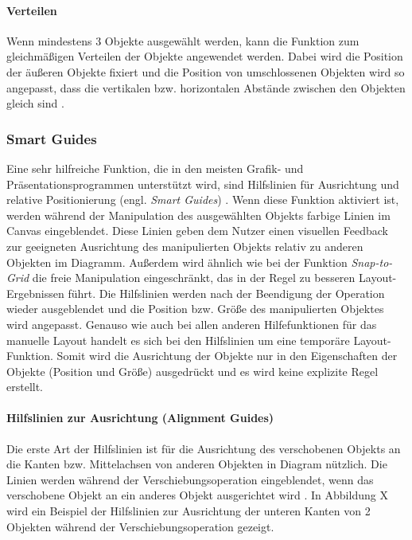 \paragraph{Verteilen}

Wenn mindestens 3 Objekte ausgewählt werden, kann die Funktion zum gleichmäßigen Verteilen der Objekte angewendet werden. Dabei wird die Position der äußeren Objekte fixiert und die Position von umschlossenen Objekten wird so angepasst, dass die vertikalen bzw. horizontalen Abstände zwischen den Objekten gleich sind \cite{11Keynote}.


\subsubsection{Smart Guides}
\label{subsubsec:smart-guides}

Eine sehr hilfreiche Funktion, die in den meisten Grafik- und Präsentationsprogrammen unterstützt wird, sind Hilfslinien für Ausrichtung und relative Positionierung (engl. \textit{Smart Guides}) \cite{11Keynote}. Wenn diese Funktion aktiviert ist, werden während der Manipulation des ausgewählten Objekts farbige Linien im Canvas eingeblendet. Diese Linien geben dem Nutzer einen visuellen Feedback zur geeigneten Ausrichtung des manipulierten Objekts relativ zu anderen Objekten im Diagramm. Außerdem wird ähnlich wie bei der Funktion \textit{Snap-to-Grid} die freie Manipulation eingeschränkt, das in der Regel zu besseren Layout-Ergebnissen führt. Die Hilfslinien werden nach der Beendigung der Operation wieder ausgeblendet und die Position bzw. Größe des manipulierten Objektes wird angepasst. Genauso wie auch bei allen anderen Hilfefunktionen für das manuelle Layout handelt es sich bei den Hilfslinien um eine temporäre Layout-Funktion. Somit wird die Ausrichtung der Objekte nur in den Eigenschaften der Objekte (Position und Größe) ausgedrückt und es wird keine explizite Regel erstellt.

\paragraph{Hilfslinien zur Ausrichtung (Alignment Guides)}

Die erste Art der Hilfslinien ist für die Ausrichtung des verschobenen Objekts an die Kanten bzw. Mittelachsen von anderen Objekten in Diagram nützlich. Die Linien werden während der Verschiebungsoperation eingeblendet, wenn das verschobene Objekt an ein anderes Objekt ausgerichtet wird \cite{11Keynote}. In Abbildung X wird ein Beispiel der Hilfslinien zur Ausrichtung der unteren Kanten von 2 Objekten während der Verschiebungsoperation gezeigt.

